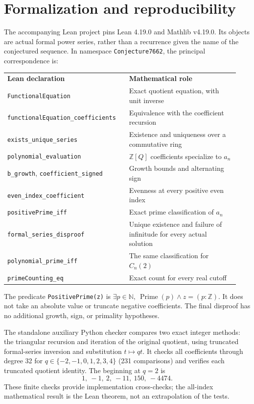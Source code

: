 \documentclass[11pt]{article}
\newcommand{\Z}{\mathbb Z}
\newcommand{\N}{\mathbb N}
\begin{document}
\newpage
\section{Formalization and reproducibility}
The accompanying Lean project pins Lean 4.19.0 and Mathlib v4.19.0.
Its objects are actual formal power series, rather than a recurrence
given the name of the conjectured sequence. In namespace
\texttt{Conjecture7662}, the principal correspondence is:
\begin{center}
\small
\begin{tabular}{@{}p{0.49\linewidth}p{0.45\linewidth}@{}}
\textbf{Lean declaration} & \textbf{Mathematical role}\\[4pt]
\texttt{FunctionalEquation} & Exact quotient equation, with unit inverse\\[3pt]
\texttt{functionalEquation\_coefficients} & Equivalence with the coefficient recursion\\[3pt]
\texttt{exists\_unique\_series} & Existence and uniqueness over a commutative ring\\[3pt]
\texttt{polynomial\_evaluation} & $\Z[Q]$ coefficients specialize to $a_n$\\[3pt]
\texttt{b\_growth}, \texttt{coefficient\_signed} & Growth bounds and alternating sign\\[3pt]
\texttt{even\_index\_coefficient} & Evenness at every positive even index\\[3pt]
\texttt{positivePrime\_iff} & Exact prime classification of $a_n$\\[3pt]
\texttt{formal\_series\_disproof} & Unique existence and failure of infinitude for every actual solution\\[3pt]
\texttt{polynomial\_prime\_iff} & The same classification for $C_n(2)$\\[3pt]
\texttt{primeCounting\_eq} & Exact count for every real cutoff
\end{tabular}
\end{center}
The predicate \texttt{PositivePrime(z)} is
$\exists p\in\N,\ \operatorname{Prime}(p)\land z=(p:\Z)$.
It does not take an absolute value or truncate negative coefficients.
The final disproof has no additional growth, sign, or primality hypotheses.

The standalone auxiliary Python checker compares two exact integer methods:
the triangular recursion and iteration of the original quotient, using
truncated formal-series inversion and substitution $t\mapsto qt$.
It checks all coefficients through degree 32 for
$q\in\{-2,-1,0,1,2,3,4\}$ (231 comparisons) and verifies each
truncated quotient identity.
The beginning at $q=2$ is
\[
 1,\ -1,\ 2,\ -11,\ 150,\ -4474.
\]
These finite checks provide implementation cross-checks; the all-index
mathematical result is the Lean theorem, not an extrapolation of the tests.
\end{document}
